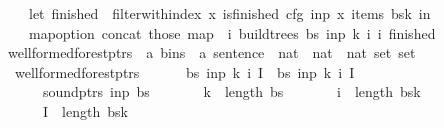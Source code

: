 \begin{isabellebody}
\ \ \ \ let\ finished\ {\isacharequal}{\kern0pt}\ filter{\isacharunderscore}{\kern0pt}with{\isacharunderscore}{\kern0pt}index\ {\isacharparenleft}{\kern0pt}{\isasymlambda}x{\isachardot}{\kern0pt}\ is{\isacharunderscore}{\kern0pt}finished\ cfg\ inp\ x{\isacharparenright}{\kern0pt}\ {\isacharparenleft}{\kern0pt}items\ {\isacharparenleft}{\kern0pt}bs{\isacharbang}{\kern0pt}k{\isacharparenright}{\kern0pt}{\isacharparenright}{\kern0pt}\ in\isanewline
\ \ \ \ map{\isacharunderscore}{\kern0pt}option\ concat\ {\isacharparenleft}{\kern0pt}those\ {\isacharparenleft}{\kern0pt}map\ {\isacharparenleft}{\kern0pt}{\isasymlambda}{\isacharparenleft}{\kern0pt}{\isacharunderscore}{\kern0pt}{\isacharcomma}{\kern0pt}\ i{\isacharparenright}{\kern0pt}{\isachardot}{\kern0pt}\ build{\isacharunderscore}{\kern0pt}trees{\isacharprime}{\kern0pt}\ bs\ inp\ k\ i\ {\isacharbraceleft}{\kern0pt}i{\isacharbraceright}{\kern0pt}{\isacharparenright}{\kern0pt}\ finished{\isacharparenright}{\kern0pt}{\isacharparenright}{\kern0pt}\isanewline
\ \ {\isacharparenright}{\kern0pt}{\isachardoublequoteclose}\isanewline
\isanewline
{}\isamarkupfalse%
\ wellformed{\isacharunderscore}{\kern0pt}forest{\isacharunderscore}{\kern0pt}ptrs\ {\isacharcolon}{\kern0pt}{\isacharcolon}{\kern0pt}\ {\isachardoublequoteopen}{\isacharparenleft}{\kern0pt}{\isacharprime}{\kern0pt}a\ bins\ {\isasymtimes}\ {\isacharprime}{\kern0pt}a\ sentence\ {\isasymtimes}\ nat\ {\isasymtimes}\ nat\ {\isasymtimes}\ nat\ set{\isacharparenright}{\kern0pt}\ set{\isachardoublequoteclose}\ \isanewline
\ \ {\isachardoublequoteopen}wellformed{\isacharunderscore}{\kern0pt}forest{\isacharunderscore}{\kern0pt}ptrs\ {\isacharequal}{\kern0pt}\ {\isacharbraceleft}{\kern0pt}\isanewline
\ \ \ \ {\isacharparenleft}{\kern0pt}bs{\isacharcomma}{\kern0pt}\ inp{\isacharcomma}{\kern0pt}\ k{\isacharcomma}{\kern0pt}\ i{\isacharcomma}{\kern0pt}\ I{\isacharparenright}{\kern0pt}\ {\isacharbar}{\kern0pt}\ bs\ inp\ k\ i\ I{\isachardot}{\kern0pt}\isanewline
\ \ \ \ \ \ sound{\isacharunderscore}{\kern0pt}ptrs\ inp\ bs\ {\isasymand}\isanewline
\ \ \ \ \ \ k\ {\isacharless}{\kern0pt}\ length\ bs\ {\isasymand}\isanewline
\ \ \ \ \ \ i\ {\isacharless}{\kern0pt}\ length\ {\isacharparenleft}{\kern0pt}bs{\isacharbang}{\kern0pt}k{\isacharparenright}{\kern0pt}\ {\isasymand}\isanewline
\ \ \ \ \ \ I\ {\isasymsubseteq}\ {\isacharbraceleft}{\kern0pt}{}{\isachardot}{\kern0pt}{\isachardot}{\kern0pt}{\isacharless}{\kern0pt}length\ {\isacharparenleft}{\kern0pt}bs{\isacharbang}{\kern0pt}k{\isacharparenright}{\kern0pt}{\isacharbraceright}{\kern0pt}\ {\isasymand}\isanewline

\end{isabellebody}
